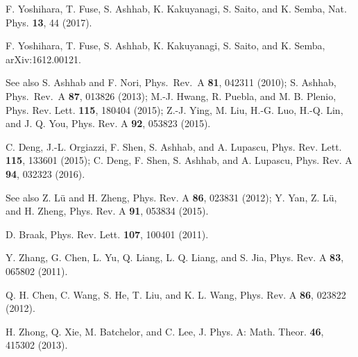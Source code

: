 \documentclass[aps,twocolumn,superscriptaddress]{revtex4}
\begin{document}
\begin{thebibliography}{99}
 F. Yoshihara, T. Fuse, S. Ashhab, K. Kakuyanagi, S. Saito, and K. Semba, Nat. Phys. {\bf 13}, 44 (2017).

 F. Yoshihara, T. Fuse, S. Ashhab, K. Kakuyanagi, S. Saito, and K. Semba, arXiv:1612.00121.

 See also S. Ashhab and F. Nori, Phys.~Rev.~A {\bf 81}, 042311 (2010); S. Ashhab, Phys.~Rev.~A {\bf 87}, 013826 (2013); M.-J. Hwang, R. Puebla, and M. B. Plenio, Phys. Rev. Lett. {\bf 115}, 180404 (2015); Z.-J. Ying, M. Liu, H.-G. Luo, H.-Q. Lin, and J. Q. You, Phys. Rev. A {\bf 92}, 053823 (2015).

 C. Deng, J.-L. Orgiazzi, F. Shen, S. Ashhab, and A. Lupascu, Phys. Rev. Lett. {\bf 115}, 133601 (2015); C. Deng, F. Shen, S. Ashhab, and A. Lupascu, Phys. Rev. A {\bf 94}, 032323 (2016).

 See also Z. L\"u and H. Zheng, Phys. Rev. A {\bf 86}, 023831 (2012); Y. Yan, Z. L\"u, and H. Zheng, Phys. Rev. A {\bf 91}, 053834 (2015).

 D. Braak, Phys. Rev. Lett. {\bf 107}, 100401 (2011).

 Y. Zhang, G. Chen, L. Yu, Q. Liang, L. Q. Liang, and S. Jia, Phys. Rev. A {\bf 83}, 065802 (2011).

 Q. H. Chen, C. Wang, S. He, T. Liu, and K. L. Wang, Phys. Rev. A {\bf 86}, 023822 (2012).

 H. Zhong, Q. Xie, M. Batchelor, and C. Lee, J. Phys. A: Math. Theor. {\bf 46}, 415302 (2013).

\end{thebibliography}
\end{document}
